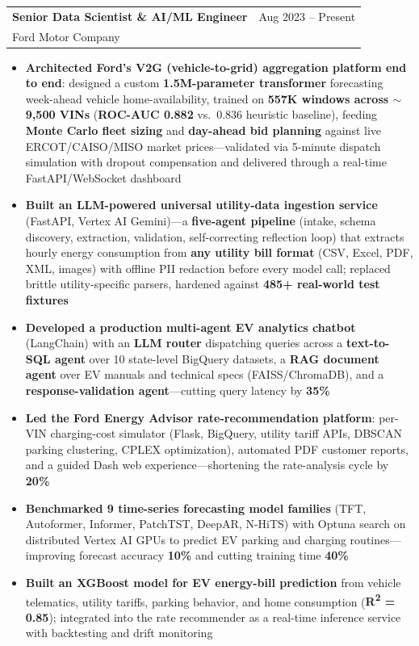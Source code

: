 \documentclass[10pt,letterpaper]{article}
\makeatletter
\newcommand{\cventry}[5]{%
  \noindent\begin{tabularx}{\textwidth}{@{}X r@{}}
    {\bfseries\color{headerblue}#2} & {\color{graytext}#1} \\
    {\color{accentcolor}#3}\enskip{\color{lightgray}#4} & \\
  \end{tabularx}%
  \vspace{0.02em}%
  #5%
  \vspace{0.14em}%
}
\makeatother
\begin{document}
\cventry{Aug 2023 -- Present}{Senior Data Scientist \& AI/ML Engineer}{Ford Motor Company}{Detroit, MI}{
\begin{itemize}[leftmargin=0.4cm, itemsep=0.02cm, topsep=0.04cm, label={\color{goldaccent}\textbullet}]
  \item \textbf{Architected Ford's V2G (vehicle-to-grid) aggregation platform end to end}: designed a custom \textbf{1.5M-parameter transformer} forecasting week-ahead vehicle home-availability, trained on \textbf{557K windows across $\sim$9{,}500 VINs} (\textbf{ROC-AUC 0.882} vs.\ 0.836 heuristic baseline), feeding \textbf{Monte Carlo fleet sizing} and \textbf{day-ahead bid planning} against live ERCOT/CAISO/MISO market prices---validated via 5-minute dispatch simulation with dropout compensation and delivered through a real-time FastAPI/WebSocket dashboard
  \item \textbf{Built an LLM-powered universal utility-data ingestion service} (FastAPI, Vertex AI Gemini)---a \textbf{five-agent pipeline} (intake, schema discovery, extraction, validation, self-correcting reflection loop) that extracts hourly energy consumption from \textbf{any utility bill format} (CSV, Excel, PDF, XML, images) with offline PII redaction before every model call; replaced brittle utility-specific parsers, hardened against \textbf{485+ real-world test fixtures}
  \item \textbf{Developed a production multi-agent EV analytics chatbot} (LangChain) with an \textbf{LLM router} dispatching queries across a \textbf{text-to-SQL agent} over 10 state-level BigQuery datasets, a \textbf{RAG document agent} over EV manuals and technical specs (FAISS/ChromaDB), and a \textbf{response-validation agent}---cutting query latency by \textbf{35\%}
  \item \textbf{Led the Ford Energy Advisor rate-recommendation platform}: per-VIN charging-cost simulator (Flask, BigQuery, utility tariff APIs, DBSCAN parking clustering, CPLEX optimization), automated PDF customer reports, and a guided Dash web experience---shortening the rate-analysis cycle by \textbf{20\%}
  \item \textbf{Benchmarked 9 time-series forecasting model families} (TFT, Autoformer, Informer, PatchTST, DeepAR, N-HiTS) with Optuna search on distributed Vertex AI GPUs to predict EV parking and charging routines---improving forecast accuracy \textbf{10\%} and cutting training time \textbf{40\%}
  \item \textbf{Built an XGBoost model for EV energy-bill prediction} from vehicle telematics, utility tariffs, parking behavior, and home consumption (\textbf{R\textsuperscript{2} = 0.85}); integrated into the rate recommender as a real-time inference service with backtesting and drift monitoring

\end{itemize}}
\end{document}
